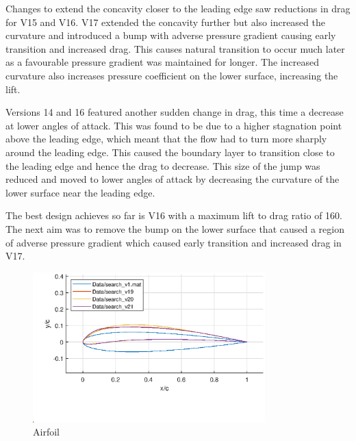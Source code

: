 \documentclass{article}
\begin{document}
Changes to extend the concavity closer to the leading edge saw reductions in drag for V15 and V16.
V17 extended the concavity further but also increased the curvature and introduced a bump with adverse pressure gradient causing early transition and increased drag.
This causes natural transition to occur much later as a favourable pressure gradient was maintained for longer.
The increased curvature also increases pressure coefficient on the lower surface, increasing the lift.

Versions 14 and 16 featured another sudden change in drag, this time a decrease at lower angles of attack.
This was found to be due to a higher stagnation point above the leading edge, which meant that the flow had to turn more sharply around the leading edge.
This caused the boundary layer to transition close to the leading edge and hence the drag to decrease.
This size of the jump was reduced and moved to lower angles of attack by decreasing the curvature of the lower surface near the leading edge.

The best design achieves so far is V16 with a maximum lift to drag ratio of 160.
The next aim was to remove the bump on the lower surface that caused a region of adverse pressure gradient
which caused early transition and increased drag in V17.

\begin{figure}[H]
    \centering
    \includegraphics[width=0.8\textwidth]{figures/hiRe_geometry_21.eps}
    \caption{Airfoil}
    \label{fig:v21_geometry}
\end{figure}
\end{document}
